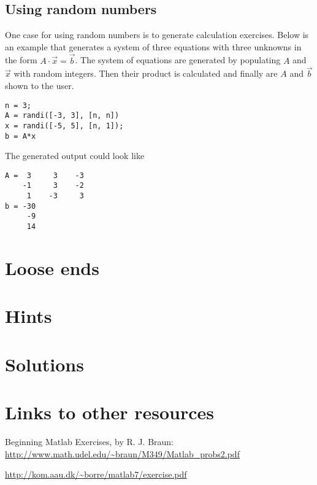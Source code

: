 \documentclass[fleqn, 12pt,a4paper]{article}
\newcounter{ex}
\numberwithin{ex}{section}
\begin{document}
\subsection{Using random numbers}

One case for using random numbers is to generate 
calculation exercises. 
Below is an example that generates a system of three
equations with three unknowns in the form 
$A \cdot \vec{x} = \vec{b}$.
The system of equations are generated by populating 
$A$ and $\vec{x}$ with random integers.
Then their product is calculated and finally are
$A$ and $\vec{b}$ shown to the user.
\begin{lstlisting}
n = 3;
A = randi([-3, 3], [n, n])
x = randi([-5, 5], [n, 1]);
b = A*x
\end{lstlisting}
The generated output could look like
\begin{lstlisting}
A =  3     3    -3
    -1     3    -2
     1    -3     3
b = -30
     -9
     14
\end{lstlisting}



\section{Loose ends}











\newpage
\section{Hints}



\newpage
\section{Solutions}



\newpage
\section{Links to other resources}

Beginning Matlab Exercises, by R. J. Braun: 
\url{http://www.math.udel.edu/~braun/M349/Matlab_probs2.pdf}

\url{http://kom.aau.dk/~borre/matlab7/exercise.pdf}
\end{document}
